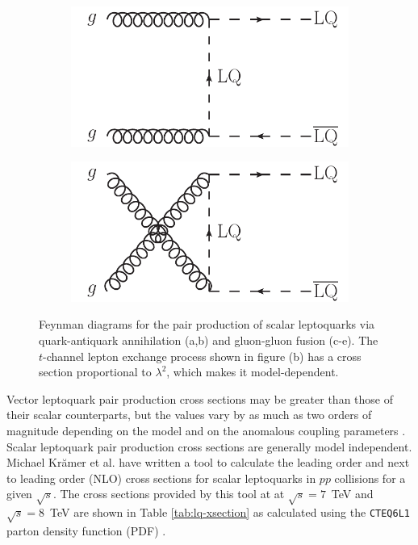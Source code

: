 \begin{figure}
  \begin{subfigure}[b]{0.45\textwidth}
    \includegraphics[width=\textwidth]{tex/theory/fig/LO_FD_LQ_pair_e}
    \caption{}
    \label{fig:feynman_LO_LQ_pair_e}
  \end{subfigure}
  \begin{subfigure}[b]{0.45\textwidth}
    \includegraphics[width=\textwidth]{tex/theory/fig/LO_FD_LQ_pair_f}
    \caption{}
    \label{fig:feynman_LO_LQ_pair_f}
  \end{subfigure}
  \caption{Feynman diagrams for the pair production of scalar leptoquarks via
    quark-antiquark annihilation (a,b) and gluon-gluon fusion (c-e).
    The $t$-channel lepton exchange process shown in figure (b) has
    a cross section proportional to $\lambda^2$, which makes it
    model-dependent.  
  }
  \label{fig:feynman_LO_LQ_pair}
\end{figure}

Vector leptoquark pair production cross sections may be greater than those of their scalar
counterparts, but the values vary by as much as two orders of magnitude 
depending on the model and on the anomalous coupling parameters 
\cite{lq-vector-to-gauge-bosons-quartic-trilinear-2}. Scalar leptoquark pair 
production cross sections are generally model independent.
Michael Kr\u{a}mer et al. \cite{kramer} have written a tool 
to calculate the leading order and next to leading order 
(NLO)
cross sections for scalar leptoquarks in 
$pp$ collisions for a given $\sqrt{s}$.  
The cross sections provided by this tool at 
at $\sqrt{s} = 7$~TeV and $\sqrt{s} = 8$~TeV 
are shown in Table \ref{tab:lq-xsection} as calculated using
the {\tt CTEQ6L1} parton density function 
(PDF)
\cite{cteq}.

